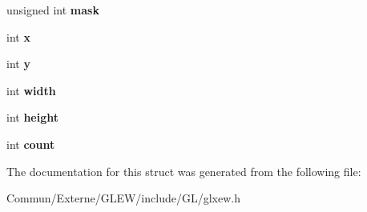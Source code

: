 \begin{DoxyCompactItemize}
\item 
unsigned int {\bfseries mask}\hypertarget{struct_g_l_x_buffer_clobber_event_s_g_i_x_a74b4ad1ad3cac011001151411f621da1}{}\label{struct_g_l_x_buffer_clobber_event_s_g_i_x_a74b4ad1ad3cac011001151411f621da1}

\item 
int {\bfseries x}\hypertarget{struct_g_l_x_buffer_clobber_event_s_g_i_x_a5118d48c3c8d5253d39922b5014b52ff}{}\label{struct_g_l_x_buffer_clobber_event_s_g_i_x_a5118d48c3c8d5253d39922b5014b52ff}

\item 
int {\bfseries y}\hypertarget{struct_g_l_x_buffer_clobber_event_s_g_i_x_aef21efa11558a5b67861f96471c56003}{}\label{struct_g_l_x_buffer_clobber_event_s_g_i_x_aef21efa11558a5b67861f96471c56003}

\item 
int {\bfseries width}\hypertarget{struct_g_l_x_buffer_clobber_event_s_g_i_x_adad23535733161528427584a42bfc6eb}{}\label{struct_g_l_x_buffer_clobber_event_s_g_i_x_adad23535733161528427584a42bfc6eb}

\item 
int {\bfseries height}\hypertarget{struct_g_l_x_buffer_clobber_event_s_g_i_x_a7838dbabb76c22aa8241310a3f2363ea}{}\label{struct_g_l_x_buffer_clobber_event_s_g_i_x_a7838dbabb76c22aa8241310a3f2363ea}

\item 
int {\bfseries count}\hypertarget{struct_g_l_x_buffer_clobber_event_s_g_i_x_ad8f4f0aae058e0a1ff542679823e37a9}{}\label{struct_g_l_x_buffer_clobber_event_s_g_i_x_ad8f4f0aae058e0a1ff542679823e37a9}

\end{DoxyCompactItemize}


The documentation for this struct was generated from the following file\+:\begin{DoxyCompactItemize}
\item 
Commun/\+Externe/\+G\+L\+E\+W/include/\+G\+L/glxew.\+h\end{DoxyCompactItemize}
